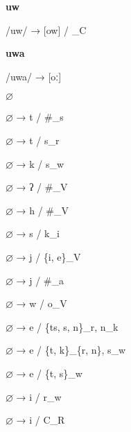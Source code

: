 \begin{center}\textbf{uw}\end{center}
\begin{multicols}{4}
\noindent /uw/ → [ow] / \_C
\end{multicols}


\begin{center}\textbf{uwa}\end{center}
\begin{multicols}{4}
\noindent /uwa/ → [oː]
\end{multicols}


\begin{center}\textbf{$\varnothing$}\end{center}
\begin{multicols}{4}
\noindent $\varnothing$ → t / \#\_s

\noindent $\varnothing$ → t / s\_r

\noindent $\varnothing$ → k / s\_w

\noindent $\varnothing$ → ʔ / \#\_V

\noindent $\varnothing$ → h / \#\_V

\noindent $\varnothing$ → s / k\_i

\noindent $\varnothing$ → j / \{i, e\}\_V

\noindent $\varnothing$ → j / \#\_a

\noindent $\varnothing$ → w / o\_V

\noindent $\varnothing$ → e / \{ts, s, n\}\_r, n\_k

\noindent $\varnothing$ → e / \{t, k\}\_\{r, n\}, s\_w

\noindent $\varnothing$ → e / \{t, s\}\_w

\noindent $\varnothing$ → i / r\_w

\noindent $\varnothing$ → i / C\_R
\end{multicols}
